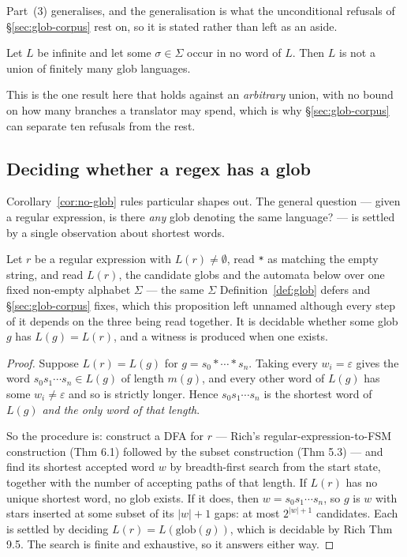 \iffull\fi

\noindent
Part~(3) generalises, and the generalisation is what the unconditional refusals of
\S\ref{sec:glob-corpus} rest on, so it is stated rather than left as an aside.

\begin{corollary}\label{cor:absent-char}
Let $L$ be infinite and let some $\sigma\in\Sigma$ occur in no word of $L$. Then $L$ is
not a union of finitely many glob languages.
\end{corollary}
\iffull\fi

\noindent
This is the one result here that holds against an \emph{arbitrary} union, with no bound
on how many branches a translator may spend, which is why \S\ref{sec:glob-corpus} can
separate ten refusals from the rest.

\subsection{Deciding whether a regex has a glob}
\label{sec:decide}

Corollary~\ref{cor:no-glob} rules particular shapes out. The general question --- given a
regular expression, is there \emph{any} glob denoting the same language? --- is settled by
a single observation about shortest words.

\begin{proposition}\label{prop:decidable}
Let $r$ be a regular expression with $L(r)\neq\emptyset$, read \texttt{*} as matching
the empty string, and read $L(r)$, the candidate globs and the automata below over one
fixed non-empty alphabet $\Sigma$ --- the same $\Sigma$ Definition~\ref{def:glob} defers
and \S\ref{sec:glob-corpus} fixes, which this proposition left unnamed although every step
of it depends on the three being read together. It is decidable whether some glob $g$ has
$L(g)=L(r)$, and a witness is produced when one exists.
\end{proposition}
\begin{proof}
Suppose $L(r)=L(g)$ for $g=s_0*\cdots*s_n$. Taking every $w_i=\varepsilon$ gives the word
$s_0s_1\cdots s_n\in L(g)$ of length $m(g)$, and every other word of $L(g)$ has some
$w_i\neq\varepsilon$ and so is strictly longer. Hence $s_0s_1\cdots s_n$ is the shortest
word of $L(g)$ \emph{and the only word of that length}.

So the procedure is: construct a DFA for $r$ --- Rich's regular-expression-to-FSM
construction (Thm 6.1) followed by the subset construction (Thm 5.3) --- and find its
shortest accepted
word $w$ by breadth-first search from the start state, together with the number of
accepting paths of that length. If $L(r)$ has no unique shortest word, no glob exists. If
it does, then $w=s_0s_1\cdots s_n$, so $g$ is $w$ with stars inserted at some subset of
its $|w|+1$ gaps: at most $2^{|w|+1}$ candidates. Each is settled by deciding
$L(r)=L(\mathrm{glob}(g))$, which is decidable by Rich Thm 9.5. The search is finite and
exhaustive, so it answers either way.
\end{proof}

